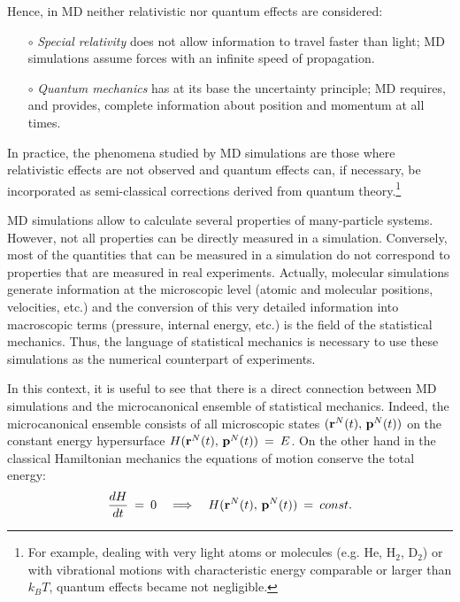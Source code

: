 Hence, in MD neither relativistic nor quantum effects are considered:
\begin{itemize}
\item[$\circ$] \textit{Special relativity} does not allow information to travel faster than light; MD simulations assume forces with an infinite speed of propagation.
\item[$\circ$] \textit{Quantum mechanics} has at its base the uncertainty principle; MD requires, and provides, complete information about position and momentum at all times.
\end{itemize}

In practice, the phenomena studied by MD simulations are those where relativistic effects are not observed and quantum effects can, if necessary, be incorporated as semi-classical corrections derived from quantum theory.\footnote{For example, dealing with very light atoms or molecules (e.g. He, H$_2$, D$_2$) or with vibrational motions with characteristic energy comparable or larger than $k_B T$, quantum effects became not negligible.}

MD simulations allow to calculate several properties of many-particle systems. However, not all properties can be directly measured in a simulation. Conversely, most of the quantities that can be measured in a simulation do not correspond to properties that are measured in real experiments.
Actually, molecular simulations generate information at the microscopic level (atomic and molecular positions, velocities, etc.) and the conversion of this very detailed information into macroscopic terms (pressure, internal energy, etc.) is the field of the statistical mechanics. Thus, the language of statistical mechanics is necessary to use these simulations as the numerical counterpart of experiments.

In this context, it is useful to see that there is a direct connection between MD simulations and the microcanonical ensemble of statistical mechanics. Indeed, the microcanonical ensemble consists of all microscopic states $( \bold{r}^N(t), \, \bold{p}^N(t) )$  on the constant energy hypersurface $H (\bold{r}^N(t) , \, \bold{p}^N(t)) \:=\: E$.
On the other hand in the classical Hamiltonian mechanics the equations of motion conserve the total energy: 
\begin{equation}\label{eq:hamilton-energy_cons}
\frac{dH}{dt} \:=\: 0 \quad \Longrightarrow \quad H ( \bold{r}^N(t), \, \bold{p}^N(t) ) \:=\: const.
\end{equation}

